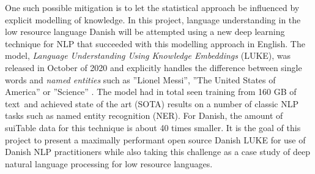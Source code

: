 \documentclass[main.tex]{subfiles}
\begin{document}
One such possible mitigation is to let the statistical approach be influenced by explicit modelling of knowledge.
In this project, language understanding in the low resource language Danish will be attempted using a new deep learning technique for NLP that succeeded with this modelling approach in English.
The model, \emph{Language Understanding Using Knowledge Embeddings} (LUKE), was released in October of 2020 and explicitly handles the difference between single words and \emph{named entities} such as ''Lionel Messi'', ''The United States of America'' or ''Science'' \cite{yamada2020luke}.
The model had in total seen training from 160 GB of text\footnotemark~and achieved state of the art (SOTA) results on a number of classic NLP tasks such as named entity recognition (NER).
For Danish, the amount of suiTable data for this technique is about 40 times smaller\footnotemark.
It is the goal of this project to present a maximally performant open source Danish LUKE for use of Danish NLP practitioners while also taking this challenge as a case study of deep natural language processing for low resource languages.
\end{document}
